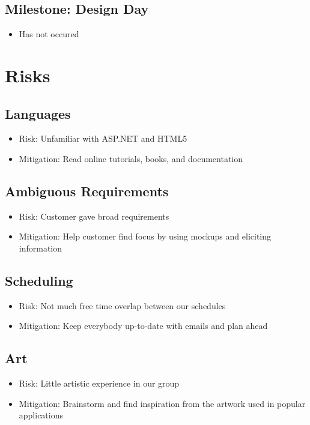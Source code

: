 \documentclass[11pt,a4paper,oneside]{article}
\begin{document}
\subsection{Milestone: Design Day}
\begin{itemize}
\item Has not occured
\end{itemize}




\section{Risks}

\subsection{Languages}

\begin{itemize}
\item Risk: Unfamiliar with ASP.NET and HTML5 
\item Mitigation: Read online tutorials, books, and documentation
\end{itemize}


\subsection{Ambiguous Requirements}

\begin{itemize}
\item Risk: Customer gave broad requirements
\item Mitigation: Help customer find focus by using mockups and eliciting information
\end{itemize}


\subsection{Scheduling}

\begin{itemize}
\item Risk: Not much free time overlap between our schedules
\item Mitigation: Keep everybody up-to-date with emails and plan ahead
\end{itemize}


\subsection{Art}

\begin{itemize}
\item Risk: Little artistic experience in our group
\item Mitigation: Brainstorm and find inspiration from the artwork used in popular applications
\end{itemize}
\end{document}
